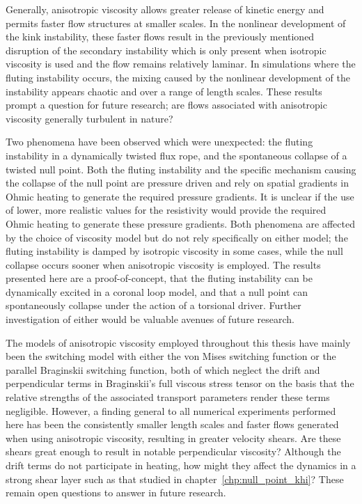 Generally, anisotropic viscosity allows greater release of kinetic energy and permits faster flow structures at smaller scales. In the nonlinear development of the kink instability, these faster flows result in the previously mentioned disruption of the secondary instability which is only present when isotropic viscosity is used and the flow remains relatively laminar. In simulations where the fluting instability occurs, the mixing caused by the nonlinear development of the instability appears chaotic and over a range of length scales. These results prompt a question for future research; are flows associated with anisotropic viscosity generally turbulent in nature? 

Two phenomena have been observed which were unexpected: the fluting instability in a dynamically twisted flux rope, and the spontaneous collapse of a twisted null point. Both the fluting instability and the specific mechanism causing the collapse of the null point are pressure driven and rely on spatial gradients in Ohmic heating to generate the required pressure gradients. It is unclear if the use of lower, more realistic values for the resistivity would provide the required Ohmic heating to generate these pressure gradients. Both phenomena are affected by the choice of viscosity model but do not rely specifically on either model; the fluting instability is damped by isotropic viscosity in some cases, while the null collapse occurs sooner when anisotropic viscosity is employed. The results presented here are a proof-of-concept, that the fluting instability can be dynamically excited in a coronal loop model, and that a null point can spontaneously collapse under the action of a torsional driver. Further investigation of either would be valuable avenues of future research.

The models of anisotropic viscosity employed throughout this thesis have mainly been the switching model with either the von Mises switching function or the parallel Braginskii switching function, both of which neglect the drift and perpendicular terms in Braginskii's full viscous stress tensor on the basis that the relative strengths of the associated transport parameters render these terms negligible. However, a finding general to all numerical experiments performed here has been the consistently smaller length scales and faster flows generated when using anisotropic viscosity, resulting in greater velocity shears. Are these shears great enough to result in notable perpendicular viscosity? Although the drift terms do not participate in heating, how might they affect the dynamics in a strong shear layer such as that studied in chapter~\ref{chp:null_point_khi}? These remain open questions to answer in future research.

